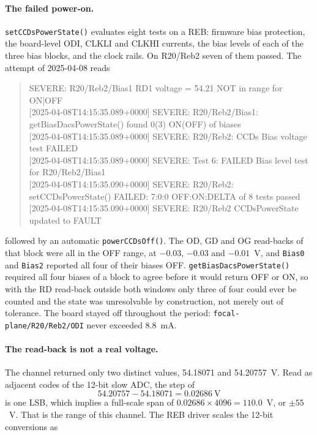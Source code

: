 \paragraph{The failed power-on.}
\label{sec:r20reb2-failure}

\texttt{setCCDsPowerState()} evaluates eight tests on a REB: firmware bias
protection, the board-level ODI, CLKLI and CLKHI currents, the bias levels of
each of the three bias blocks, and the clock rails. On R20/Reb2 seven of them
passed. The attempt of 2025-04-08 reads

\begin{quote}\small\ttfamily
[2025-04-08T14:15:35.088+0000] SEVERE: R20/Reb2/Bias1 RD1 voltage = 54.21 NOT
in range for ON|OFF \\
$[$2025-04-08T14:15:35.089+0000] SEVERE: R20/Reb2/Bias1:
getBiasDacsPowerState() found 0(3) ON(OFF) of biases \\
$[$2025-04-08T14:15:35.089+0000] SEVERE: R20/Reb2: CCDs Bias voltage test
FAILED \\
$[$2025-04-08T14:15:35.089+0000] SEVERE: Test 6: FAILED Bias level test for
R20/Reb2/Bias1 \\
$[$2025-04-08T14:15:35.090+0000] SEVERE: R20/Reb2: setCCDsPowerState()
FAILED: 7:0:0 OFF:ON:DELTA of 8 tests passed \\
$[$2025-04-08T14:15:35.090+0000] SEVERE: R20/Reb2 CCDsPowerState updated to
FAULT
\end{quote}

\noindent followed by an automatic \texttt{powerCCDsOff()}. The OD, GD and OG
read-backs of that block were all in the OFF range, at $-0.03$, $-0.03$ and
$-0.01$~V, and \texttt{Bias0} and \texttt{Bias2} reported all four of their
biases OFF. \texttt{getBiasDacsPowerState()} required all four biases of a
block to agree before it would return OFF or ON, so with the RD read-back
outside both windows only three of four could ever be counted and the state
was unresolvable by construction, not merely out of tolerance. The board
stayed off throughout the period: \texttt{focal-plane/R20/Reb2/ODI} never
exceeded 8.8~mA.

\paragraph{The read-back is not a real voltage.}
\label{sec:r20reb2-notreal}

The channel returned only two distinct values, 54.18071 and 54.20757~V. Read
as adjacent codes of the 12-bit slow ADC, the step of
%
\begin{equation}
  54.20757 - 54.18071 = 0.02686~\mathrm{V}
  \label{eq:rdv-step}
\end{equation}
%
is one LSB, which implies a full-scale span of
$0.02686\times4096 = 110.0$~V, or $\pm55$~V. That is the range of this
channel. The REB driver scales the 12-bit conversions as

